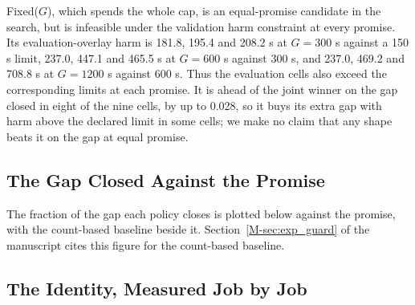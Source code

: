 \documentclass[mathematics,supfile,submit,moreauthors]{Definitions/mdpi}
\newcommand{\devnum}[1]{#1}
\begin{document}
Fixed($G$), which spends the whole cap, is an equal-promise candidate in the search,
but is infeasible under the validation harm constraint at every promise.
Its evaluation-overlay harm is \devnum{181.8}, \devnum{195.4} and \devnum{208.2} s at
$G = \devnum{300}$ s against a \devnum{150} s limit, \devnum{237.0}, \devnum{447.1} and
\devnum{465.5} s at $G = \devnum{600}$ s against \devnum{300} s, and \devnum{237.0},
\devnum{469.2} and \devnum{708.8} s at $G = \devnum{1200}$ s against \devnum{600} s.
Thus the evaluation cells also exceed the corresponding limits at each promise.
It is ahead of the joint winner on the gap
closed in eight of the nine cells, by up to \devnum{0.028}, so it buys its extra gap with harm
above the declared limit in some cells; we make no claim that any shape beats it on
the gap at equal promise.



\subsection{The Gap Closed Against the Promise}
\label{sec:supp_gapvsg}

The fraction of the gap each policy closes is plotted below against the promise, with
the count-based baseline beside it. Section~\ref*{M-sec:exp_guard} of the manuscript cites
this figure for the count-based baseline.



\subsection{The Identity, Measured Job by Job}
\label{sec:supp_identity}
\end{document}
